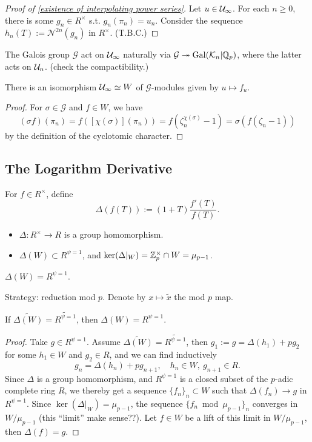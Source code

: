 \begin{proof}[Proof of \cref{existence of interpolating power series}]
    Let $u\in\mathcal{U}_\infty$.
    For each $n\ge 0$,
    there is some $g_n\in R^\times$ s.t. $g_n(\pi_n) = u_n$.
    Consider the sequence $h_n(T) := \mathcal{N}^{2n}(g_n)$ in $R^\times$.
    (T.B.C.)
\end{proof}

The Galois group $\mathcal{G}$ act on $\mathcal{U}_\infty$ naturally via $\mathcal{G}\twoheadrightarrow \operatorname{Gal}(\mathcal{K}_n|\mathbb{Q}_p)$, where the latter acts on $\mathcal{U}_n$.
(check the compactibility.)

\begin{corollary}\label{cyclotomic units isomorphic to N = 1}
    There is an isomorphism $\mathcal{U}_\infty\simeq W$
    of $\mathcal{G}$-modules given by
    $u\mapsto f_u$.
\end{corollary}
\begin{proof}
    For $\sigma\in \mathcal{G}$ and $f\in W$,
    we have
    \[(\sigma f)(\pi_n) = f([\chi(\sigma)](\pi_n)) = f(\zeta_n^{\chi(\sigma)} - 1)
    = \sigma (f(\zeta_n - 1))\]
    by the definition of the cyclotomic character.
\end{proof}


\subsection{The Logarithm Derivative}

For $f\in R^\times$,
define \[\Delta(f(T)) := (1 + T)\frac{f'(T)}{f(T)}.\]
\begin{itemize}
\item $\Delta : R^\times\to R$ is a group homomorphism.
\item $\Delta(W)\subset R^{\psi = 1}$, and $\ker(\Delta|_W) = \mathbb{Z}_p^\times\cap W = \mu_{p-1}$.

\end{itemize}


\begin{theorem}\label{N = 1 maps onto psi = 1}
    $\Delta(W) = R^{\psi = 1}$.
\end{theorem}

Strategy: reduction mod $p$.
Denote by $x\mapsto \tilde x$ the mod $p$ map.

\begin{lemma}
    If $\widetilde{\Delta(W)} = \widetilde{R^{\psi = 1}}$,
    then $\Delta(W) = R^{\psi = 1}$.
\end{lemma}
\begin{proof}
    Take $g\in R^{\psi = 1}$.
    Assume $\widetilde{\Delta(W)} = \widetilde{R^{\psi = 1}}$,
    then $g_1 := g = \Delta(h_1) + pg_2$ for some $h_1\in W$ and $g_2\in R$, and we can find inductively\[g_n = \Delta(h_n) + pg_{n+1},\quad h_n\in W,\ g_{n+1}\in R.\]
    Since $\Delta$ is a group homomorphism,
    and $R^{\psi = 1}$ is a closed subset of the $p$-adic complete ring $R$, 
    we thereby get a sequence $\{f_n\}_n\subset W$
    such that $\Delta(f_n)\to g$ in $R^{\psi = 1}$.
    Since $\ker(\Delta|_W) = \mu_{p-1}$,
    the sequence $\{f_n\bmod \mu_{p-1}\}_n$ converges in $W/\mu_{p-1}$ (this ``limit'' make sense??).
    Let $f\in W$ be a lift of this limit in $W/\mu_{p-1}$,
    then $\Delta(f) = g$.
\end{proof}

